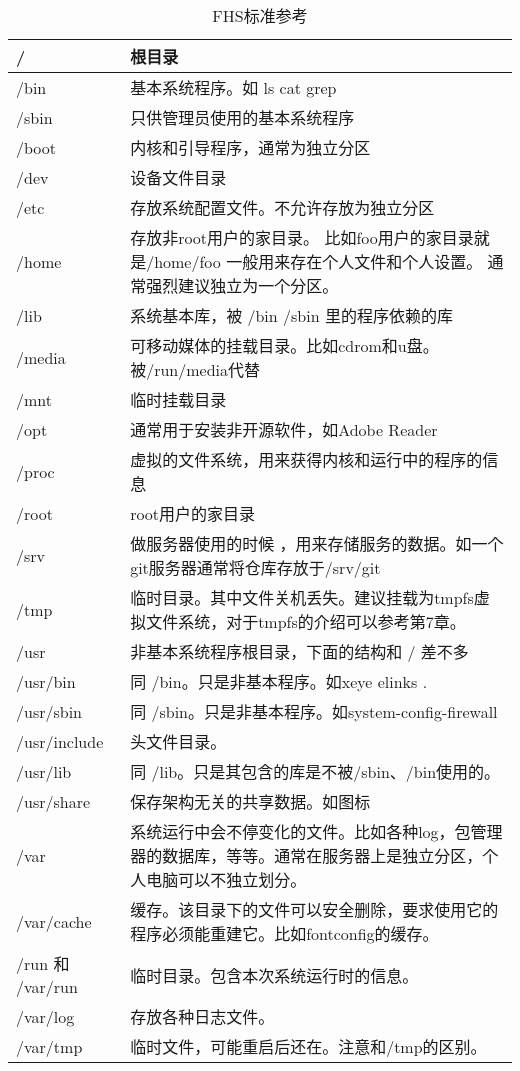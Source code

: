 \documentclass[amstex]{ctexbook}
\begin{document}
\begin{longtable}{|l|p{}|}
\caption{FHS标准参考}\\
\hline
/ & 根目录 \\\hline
/bin & 基本系统程序。如 ls cat grep \\\hline
/sbin & 只供管理员使用的基本系统程序 \\\hline
/boot & 内核和引导程序，通常为独立分区\\\hline
/dev & 设备文件目录 \\\hline
/etc & 存放系统配置文件。不允许存放为独立分区\\\hline
/home & 存放非root用户的家目录。 
比如foo用户的家目录就是/home/foo
一般用来存在个人文件和个人设置。
通常强烈建议独立为一个分区。\\\hline
/lib & 系统基本库，被 /bin /sbin 里的程序依赖的库 \\\hline
/media & 可移动媒体的挂载目录。比如cdrom和u盘。被/run/media代替\\\hline
/mnt & 临时挂载目录\\\hline
/opt & 通常用于安装非开源软件，如Adobe Reader \\\hline
/proc & 虚拟的文件系统，用来获得内核和运行中的程序的信息\\\hline
/root & root用户的家目录\\\hline
/srv & 做服务器使用的时候 ，用来存储服务的数据。如一个git服务器通常将仓库存放于/srv/git\\\hline
/tmp & 临时目录。其中文件关机丢失。建议挂载为tmpfs虚拟文件系统，对于tmpfs的介绍可以参考第7章。 \\\hline
/usr & 非基本系统程序根目录，下面的结构和 / 差不多 \\\hline
/usr/bin & 同 /bin。只是非基本程序。如xeye  elinks . \\\hline
/usr/sbin & 同 /sbin。只是非基本程序。如system-config-firewall \\\hline
/usr/include & 头文件目录。\\\hline
/usr/lib & 同 /lib。只是其包含的库是不被/sbin、/bin使用的。\\\hline
/usr/share &  保存架构无关的共享数据。如图标\\\hline
/var & 系统运行中会不停变化的文件。比如各种log，包管理器的数据库，等等。通常在服务器上是独立分区，个人电脑可以不独立划分。\\\hline
/var/cache & 缓存。该目录下的文件可以安全删除，要求使用它的程序必须能重建它。比如fontconfig的缓存。\\\hline
/run 和 /var/run & 临时目录。包含本次系统运行时的信息。\\\hline
/var/log & 存放各种日志文件。\\\hline
/var/tmp & 临时文件，可能重启后还在。注意和/tmp的区别。\\\hline
\end{longtable}
\end{document}
